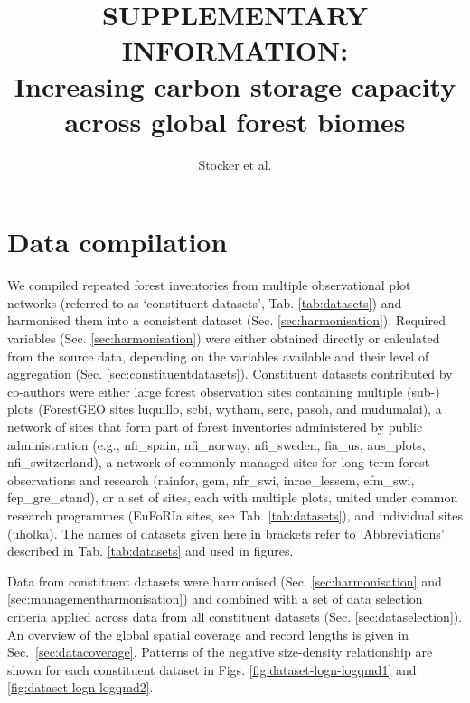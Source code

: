 \documentclass{myreport}
\begin{document}
\pagestyle{headings}

\renewcommand{\thefigure}{S\arabic{figure}}
\renewcommand{\thetable}{S\arabic{table}}
\renewcommand{\thesection}{S\arabic{section}}
\renewcommand{\theequation}{S\arabic{equation}}

%

\title{SUPPLEMENTARY INFORMATION:\\
Increasing carbon storage capacity across global forest biomes}
\author{Stocker et al.}

\maketitle

\tableofcontents

\section{Data compilation}

We compiled repeated forest inventories from multiple observational plot networks (referred to as `constituent datasets', Tab. \ref{tab:datasets}) and harmonised them into a consistent dataset (Sec. \ref{sec:harmonisation}). Required variables (Sec. \ref{sec:harmonisation}) were either obtained directly or calculated from the source data, depending on the variables available and their level of aggregation (Sec. \ref{sec:constituentdatasets}). Constituent datasets contributed by co-authors were either large forest observation sites containing multiple (sub-) plots (ForestGEO sites luquillo, scbi, wytham, serc, pasoh, and mudumalai), a network of sites that form part of forest inventories administered by public administration (e.g., nfi\_spain, nfi\_norway, nfi\_sweden, fia\_us, aus\_plots, nfi\_switzerland), a network of commonly managed sites for long-term forest observations and research (rainfor, gem, nfr\_swi, inrae\_lessem, efm\_swi, fep\_gre\_stand), or a set of sites, each with multiple plots, united under common research programmes (EuFoRIa sites, see Tab. \ref{tab:datasets}), and individual sites (uholka). The names of datasets given here in brackets refer to 'Abbreviations' described in Tab. \ref{tab:datasets} and used in figures.

Data from constituent datasets were harmonised (Sec. \ref{sec:harmonisation} and \ref{sec:managementharmonisation}) and combined with a set of data selection criteria applied across data from all constituent datasets (Sec. \ref{sec:dataselection}). An overview of the global spatial coverage and record lengths is given in Sec.~\ref{sec:datacoverage}. Patterns of the negative size-density relationship are shown for each constituent dataset in Figs. \ref{fig:dataset-logn-logqmd1} and \ref{fig:dataset-logn-logqmd2}.
\end{document}
